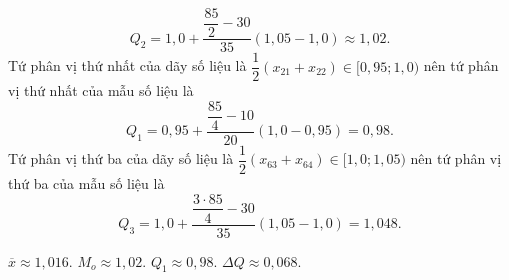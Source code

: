 \begin{ex}
{  $$Q_2=1{,}0+\dfrac{\dfrac{85}{2}-30}{35}(1{,}05-1{,}0)\approx 1,02.$$
 Tứ phân vị thứ nhất  của dãy số liệu là $\dfrac{1}{2}\left(x_{21}+x_{22}\right)\in [0{,}95; 1{,}0)$ nên tứ phân vị thứ nhất của mẫu số liệu là
 $$Q_1=0{,}95+\dfrac{\dfrac{85}{4}-10}{20}(1{,}0-0{,}95)=0{,}98.$$ 
 Tứ phân vị thứ ba của dãy số liệu  là $\dfrac{1}{2}\left(x_{63}+x_{64}\right)\in [1{,}0; 1{,}05)$ nên tứ phân vị thứ ba của mẫu số liệu là $$Q_3=1{,}0+\dfrac{\dfrac{3\cdot 85}{4}-30}{35}(1{,}05-1{,}0)=1{,}048.$$
 \begin{itemchoice}
   \itemch $\overline{x}\approx 1{,}016$.
  \itemch $M_o\approx 1{,}02$. 
  \itemch  $Q_1\approx 0{,}98$.
  \itemch  $\Delta Q\approx 0{,}068$.
 \end{itemchoice}
 }
\end{ex}

